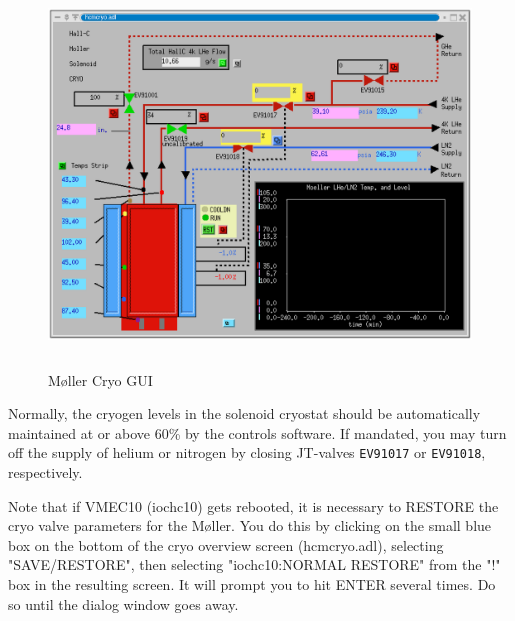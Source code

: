 \begin{figure}
\begin{center}
\includegraphics[height=4in]{molcryogui.ps}
\caption{M\o ller Cryo GUI\label{molcryomedm}}
\end{center}
\end{figure}
%

Normally, the cryogen levels in the solenoid cryostat should be
automatically maintained at or above 60\% by the controls software.
If mandated, you may turn off the supply of helium or nitrogen by
closing JT-valves {\tt EV91017} or {\tt EV91018}, respectively.

Note that if VMEC10 (iochc10) gets rebooted, it is necessary to RESTORE the cryo valve
parameters for the M\o ller. You do this by clicking on the small blue box on the
bottom of the cryo overview screen (hcmcryo.adl), selecting "SAVE/RESTORE",
then selecting "iochc10:NORMAL RESTORE" from the "!" box in the resulting
screen. It will prompt you to hit ENTER several times. Do so until the dialog
window goes away.

